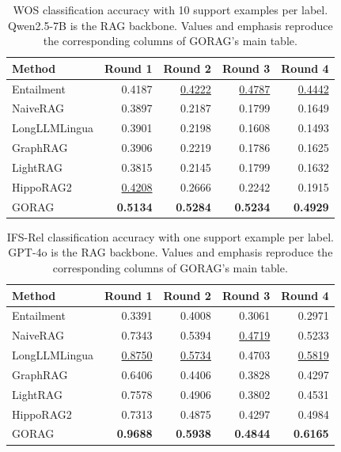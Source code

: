 \begin{table}[tbp]
\centering
\caption{WOS classification accuracy with 10 support examples per label. Qwen2.5-7B is the RAG backbone. Values and emphasis reproduce the corresponding columns of GORAG's main table.}
\label{tab:gorag:main-wos-10shot}
\small
\begin{tabular}{lrrrr}
\hline
Method & Round 1 & Round 2 & Round 3 & Round 4\\
\hline
Entailment & {0.4187} & \underline{0.4222} & \underline{0.4787} & \underline{0.4442} \\
NaiveRAG & 0.3897 & 0.2187 & 0.1799 & 0.1649 \\
LongLLMLingua & 0.3901 & 0.2198 & 0.1608 & 0.1493 \\
GraphRAG & 0.3906 & 0.2219 & 0.1786 & 0.1625 \\
LightRAG & 0.3815 & 0.2145 & 0.1799 & 0.1632 \\
HippoRAG2 & \underline{0.4208} & 0.2666 & 0.2242 & 0.1915 \\
GORAG & \textbf{0.5134} & \textbf{0.5284} & \textbf{0.5234} & \textbf{0.4929} \\
\hline
\end{tabular}
\end{table}

\begin{table}[tbp]
\centering
\caption{IFS-Rel classification accuracy with one support example per label. GPT-4o is the RAG backbone. Values and emphasis reproduce the corresponding columns of GORAG's main table.}
\label{tab:gorag:main-ifs}
\small
\begin{tabular}{lrrrr}
\hline
Method & Round 1 & Round 2 & Round 3 & Round 4\\
\hline
Entailment & 0.3391 & {0.4008} & {0.3061} & {0.2971} \\
NaiveRAG & {0.7343} & 0.5394 & \underline{0.4719} & 0.5233 \\
LongLLMLingua & \underline{0.8750} & \underline{0.5734} & 0.4703 & \underline{0.5819} \\
GraphRAG & 0.6406 & 0.4406 & 0.3828 & 0.4297 \\
LightRAG & 0.7578 & 0.4906 & 0.3802 & 0.4531 \\
HippoRAG2 & 0.7313 & 0.4875 & 0.4297 & 0.4984 \\
GORAG & \textbf{0.9688} & \textbf{0.5938} & \textbf{0.4844} & \textbf{0.6165} \\
\hline
\end{tabular}
\end{table}

